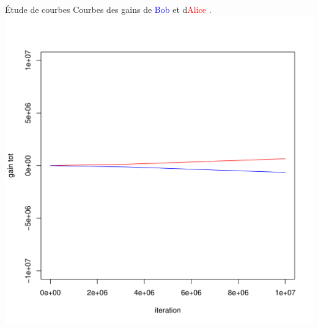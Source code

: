\begin{frame}{Étude de courbes}
Courbes des gains de \textcolor{blue}{Bob} et d\textcolor{red}{Alice} .
\centering
    \includegraphics[width =1 \textwidth, height = 0.8 \textheight]{Images/Courbes/LRI/Gain.png}
\end{frame}


